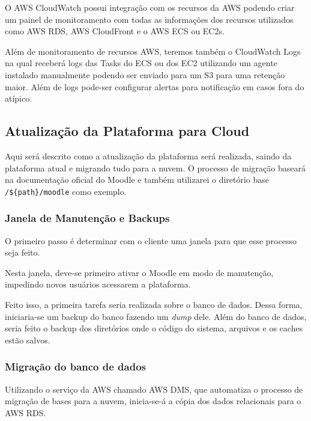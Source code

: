 \documentclass{article}
\begin{document}
O AWS CloudWatch possui integração com os recursos da AWS podendo criar um painel de monitoramento com todas as informações dos recursos utilizados como AWS RDS, AWS CloudFront e o AWS ECS ou EC2s.

Além de monitoramento de recursos AWS, teremos também o CloudWatch Logs na qual receberá logs das Tasks do ECS ou dos EC2 utilizando um agente instalado manualmente podendo ser enviado para um S3 para uma retenção maior.
Além de logs pode-ser configurar alertas para notificação em casos fora do atípico.

\subsection{Atualização da Plataforma para Cloud}
Aqui será descrito como a atualização da plataforma será realizada, saindo da plataforma atual e migrando tudo para a nuvem.
O processo de migração baseará na documentação oficial do Moodle e também utilizarei o diretório base \texttt{/\$\{path\}/moodle} como exemplo.

\subsubsection{Janela de Manutenção e Backups}
O primeiro passo é determinar com o cliente uma janela para que esse processo seja feito. 

Nesta janela, deve-se primeiro ativar o Moodle em modo de manutenção, impedindo novos usuários acessarem a plataforma.

Feito isso, a primeira tarefa seria realizada sobre o banco de dados.
Dessa forma, iniciaria-se um backup do banco fazendo um \textit{dump} dele.
Além do banco de dados, seria feito o backup dos diretórios onde o código do sistema, arquivos e os caches estão salvos.

\subsubsection{Migração do banco de dados}


Utilizando o serviço da AWS chamado AWS DMS, que automatiza o processo de migração de bases para a nuvem, inicia-se-á a cópia dos dados relacionais para o AWS RDS.
\end{document}
